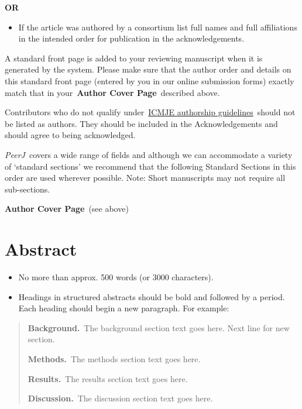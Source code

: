 \documentclass[10pt]{article}
\providecommand{\tightlist}{\setlength{\itemsep}{0pt}\setlength{\parskip}{0pt}}%
\begin{document}
\textbf{OR}

\begin{itemize}
\tightlist
\item
  If the article was authored by a consortium list full names and full
  affiliations in the intended order for publication in the
  acknowledgements.
\end{itemize}



\pagebreak

A standard front page is added to your reviewing manuscript when it is
generated by the system. Please make sure that the author order and
details on this standard front page (entered by you in our online
submission forms) exactly match that in your~\textbf{Author Cover
Page}~described above.

Contributors who do not qualify
under~\href{http://www.icmje.org/recommendations/browse/roles-and-responsibilities/defining-the-role-of-authors-and-contributors.html\#two}{ICMJE
authorship guidelines}~should not be listed as authors. They should be
included in the Acknowledgements and should agree to being acknowledged.

\emph{PeerJ}~covers a wide range of fields and although we can
accommodate a variety of `standard sections' we recommend that the
following Standard Sections in this order are used wherever possible.
Note: Short manuscripts may not require all sub-sections.

\textbf{Author Cover Page}~(see above)

\section*{Abstract}

{\label{647294}}

\begin{itemize}
\tightlist
\item
  No more than approx. 500 words (or 3000 characters).
\item
  Headings in structured abstracts should be bold and followed by a
  period. Each heading should begin a new paragraph. For example:
\end{itemize}

\begin{quote}
\textbf{Background.}~The background section text goes here. Next line
for new section.

\textbf{Methods.}~The methods section text goes here.

\textbf{Results.}~The results section text goes here.

\textbf{Discussion.}~The discussion section text goes here.
\end{quote}
\end{document}
